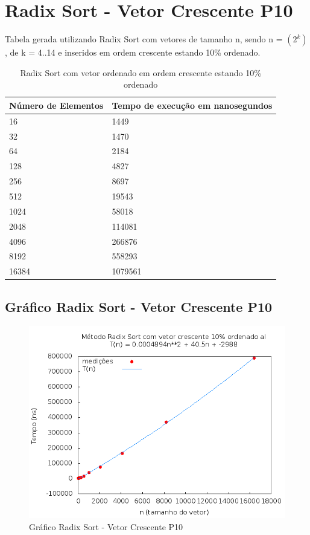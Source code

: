 \documentclass[12pt,a4paper,twoside]{report}
\begin{document}
\section{Radix Sort - Vetor Crescente P10}
Tabela gerada utilizando Radix Sort com vetores de tamanho n, sendo n = $(2^k)$, de k = 4..14 e inseridos em ordem crescente estando 10\% ordenado.
\begin{table}[H]
\centering
\caption{Radix Sort com vetor ordenado em ordem crescente estando 10\% ordenado}
\label{my-label}
\begin{tabular}{|l|l|}
\hline
\multicolumn{1}{|c|}{\textbf{Número de Elementos}} & \multicolumn{1}{c|}{\textbf{Tempo de execução em nanosegundos}} \\ \hline
16 & 1449 \\ \hline
32 & 1470 \\ \hline
64 & 2184 \\ \hline
128 & 4827 \\ \hline
256 & 8697 \\ \hline
512 & 19543 \\ \hline
1024 & 58018 \\ \hline
2048 & 114081 \\ \hline
4096 & 266876 \\ \hline
8192 & 558293 \\ \hline
16384 & 1079561 \\ \hline
\end{tabular}
\end{table}

\subsection{Gráfico Radix Sort - Vetor Crescente P10}
\begin{figure}[H]
    \centering
    \includegraphics[width=0.7\linewidth]{graficos/RadixSort/vIntCrescenteP10/vIntCrescenteP10.png}
  \caption{Gráfico Radix Sort - Vetor Crescente P10}
\end{figure}
\end{document}
